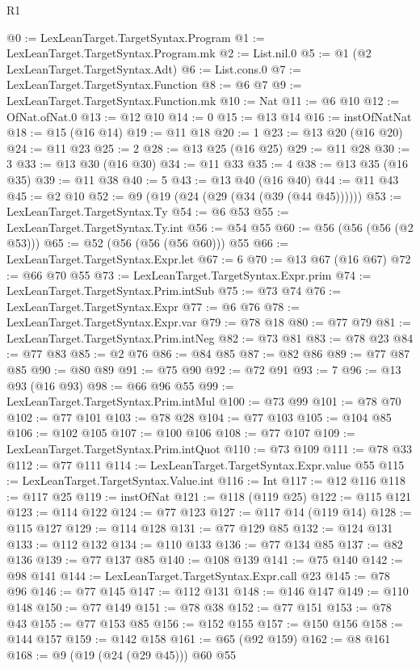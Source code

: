 \begin{lexlean}{R1}
\begin{coremodule}
@0 := LexLeanTarget.TargetSyntax.Program
@1 := LexLeanTarget.TargetSyntax.Program.mk
@2 := List.nil.{0}
@5 := @1 (@2 LexLeanTarget.TargetSyntax.Adt)
@6 := List.cons.{0}
@7 := LexLeanTarget.TargetSyntax.Function
@8 := @6 @7
@9 := LexLeanTarget.TargetSyntax.Function.mk
@10 := Nat
@11 := @6 @10
@12 := OfNat.ofNat.{0}
@13 := @12 @10
@14 := 0
@15 := @13 @14
@16 := instOfNatNat
@18 := @15 (@16 @14)
@19 := @11 @18
@20 := 1
@23 := @13 @20 (@16 @20)
@24 := @11 @23
@25 := 2
@28 := @13 @25 (@16 @25)
@29 := @11 @28
@30 := 3
@33 := @13 @30 (@16 @30)
@34 := @11 @33
@35 := 4
@38 := @13 @35 (@16 @35)
@39 := @11 @38
@40 := 5
@43 := @13 @40 (@16 @40)
@44 := @11 @43
@45 := @2 @10
@52 := @9 (@19 (@24 (@29 (@34 (@39 (@44 @45))))))
@53 := LexLeanTarget.TargetSyntax.Ty
@54 := @6 @53
@55 := LexLeanTarget.TargetSyntax.Ty.int
@56 := @54 @55
@60 := @56 (@56 (@56 (@2 @53)))
@65 := @52 (@56 (@56 (@56 @60))) @55
@66 := LexLeanTarget.TargetSyntax.Expr.let
@67 := 6
@70 := @13 @67 (@16 @67)
@72 := @66 @70 @55
@73 := LexLeanTarget.TargetSyntax.Expr.prim
@74 := LexLeanTarget.TargetSyntax.Prim.intSub
@75 := @73 @74
@76 := LexLeanTarget.TargetSyntax.Expr
@77 := @6 @76
@78 := LexLeanTarget.TargetSyntax.Expr.var
@79 := @78 @18
@80 := @77 @79
@81 := LexLeanTarget.TargetSyntax.Prim.intNeg
@82 := @73 @81
@83 := @78 @23
@84 := @77 @83
@85 := @2 @76
@86 := @84 @85
@87 := @82 @86
@89 := @77 @87 @85
@90 := @80 @89
@91 := @75 @90
@92 := @72 @91
@93 := 7
@96 := @13 @93 (@16 @93)
@98 := @66 @96 @55
@99 := LexLeanTarget.TargetSyntax.Prim.intMul
@100 := @73 @99
@101 := @78 @70
@102 := @77 @101
@103 := @78 @28
@104 := @77 @103
@105 := @104 @85
@106 := @102 @105
@107 := @100 @106
@108 := @77 @107
@109 := LexLeanTarget.TargetSyntax.Prim.intQuot
@110 := @73 @109
@111 := @78 @33
@112 := @77 @111
@114 := LexLeanTarget.TargetSyntax.Expr.value @55
@115 := LexLeanTarget.TargetSyntax.Value.int
@116 := Int
@117 := @12 @116
@118 := @117 @25
@119 := instOfNat
@121 := @118 (@119 @25)
@122 := @115 @121
@123 := @114 @122
@124 := @77 @123
@127 := @117 @14 (@119 @14)
@128 := @115 @127
@129 := @114 @128
@131 := @77 @129 @85
@132 := @124 @131
@133 := @112 @132
@134 := @110 @133
@136 := @77 @134 @85
@137 := @82 @136
@139 := @77 @137 @85
@140 := @108 @139
@141 := @75 @140
@142 := @98 @141
@144 := LexLeanTarget.TargetSyntax.Expr.call @23
@145 := @78 @96
@146 := @77 @145
@147 := @112 @131
@148 := @146 @147
@149 := @110 @148
@150 := @77 @149
@151 := @78 @38
@152 := @77 @151
@153 := @78 @43
@155 := @77 @153 @85
@156 := @152 @155
@157 := @150 @156
@158 := @144 @157
@159 := @142 @158
@161 := @65 (@92 @159)
@162 := @8 @161
@168 := @9 (@19 (@24 (@29 @45))) @60 @55

\end{coremodule}
\end{lexlean}
